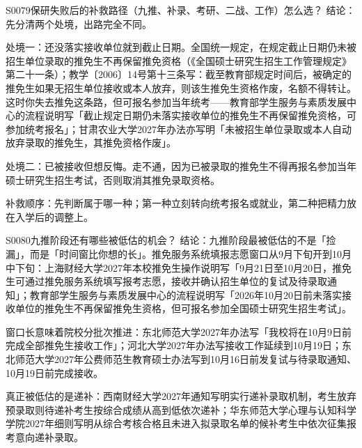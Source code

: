 \begin{qa}{S0079}{保研失败后的补救路径（九推、补录、考研、二战、工作）怎么选？}
结论：先分清两个处境，出路完全不同。

处境一：还没落实接收单位就到截止日期。全国统一规定，在规定截止日期仍未被招生单位录取的推免生不再保留推免资格（《全国硕士研究生招生工作管理规定》第二十一条）；教学〔2006〕14号第十三条写：截至教育部规定时间后，被确定的推免生如果无招生单位接收或本人放弃，则该生推免生资格作废，名额不得转让。这时你失去推免这条路，但可报名参加当年统考——教育部学生服务与素质发展中心的流程说明写「截止规定日期仍未落实接收单位的推免生不再保留推免资格，可参加统考报名」；甘肃农业大学2027年办法亦写明「未被招生单位录取或本人自动放弃录取的推免生，其推免资格作废」。

处境二：已被接收但想反悔。走不通，因为已被录取的推免生不得再报名参加当年硕士研究生招生考试，否则取消其推免录取资格。

补救顺序：先判断属于哪一种；第一种立刻转向统考报名或就业，第二种把精力放在入学后的调整上。
\end{qa}

\begin{qa}{S0080}{九推阶段还有哪些被低估的机会？}
结论：九推阶段最被低估的不是「捡漏」，而是「时间窗比你想的长」。推免服务系统填报志愿窗口从9月下旬开到10月中下旬：上海财经大学2027年本校推免生操作说明写「9月21日至10月20日，推免生可通过推免服务系统填写报考志愿，接收并确认招生单位的复试及待录取通知」；教育部学生服务与素质发展中心的流程说明写「2026年10月20日前未落实接收单位的推免生不再保留推免生资格，但可报名参加全国硕士研究生招生考试」。

窗口长意味着院校分批次推进：东北师范大学2027年办法写「我校将在10月9日前完成全部推免生接收工作」；河北大学2027年办法写接收工作延续到10月19日；东北师范大学2027年公费师范生教育硕士办法写到10月16日前发复试与待录取通知、10月19日前完成接收。

真正被低估的是递补：西南财经大学2027年通知写明实行递补录取机制，考生放弃预录取则待递补考生按综合成绩从高到低依次递补；华东师范大学心理与认知科学学院2027年细则写明从综合考核合格且未进入拟录取名单的候补考生中依次征集报考意向递补录取。
\end{qa}

